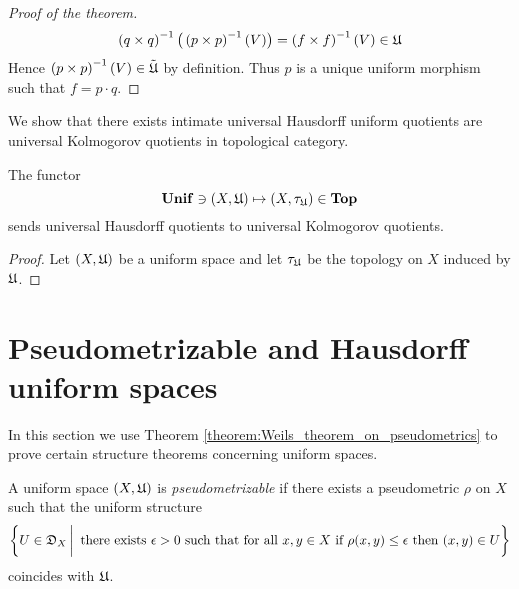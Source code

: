 \begin{proof}[Proof of the theorem]
$$\left(q\times q\right)^{-1}\big(\left(p\times p\right)^{-1}(V)\big) = \left(f\times f\right)^{-1}(V) \in {\mathfrak U}$$
Hence $\left(p\times p\right)^{-1}(V) \in \tilde{{\mathfrak U}}$ by definition. Thus $p$ is a unique uniform morphism such that $f = p\cdot q$.
\end{proof}
\noindent
We show that there exists intimate universal Hausdorff uniform quotients are universal Kolmogorov quotients in topological category.

\begin{proposition}\label{proposition:universal_Hausdordff_quotients_are_universal_Kolmogorov_quotients}
The functor
$$\mathbf{Unif} \ni (X,{\mathfrak U}) \mapsto (X,\tau_{{\mathfrak U}}) \in \mathbf{Top}$$
sends universal Hausdorff quotients to universal Kolmogorov quotients.
\end{proposition}
\begin{proof}
Let $(X,{\mathfrak U})$ be a uniform space and let $\tau_{{\mathfrak U}}$ be the topology on $X$ induced by ${\mathfrak U}$.
\end{proof}



\section{Pseudometrizable and Hausdorff uniform spaces}
\noindent
In this section we use Theorem \ref{theorem:Weils_theorem_on_pseudometrics} to prove certain structure theorems concerning uniform spaces. 

\begin{definition}
A uniform space $(X,{\mathfrak U})$ is \textit{pseudometrizable} if there exists a pseudometric $\rho$ on $X$ such that the uniform structure
$$\bigg\{U \in {\mathfrak D}_{X}\,\bigg|\,\mbox{ there exists }\epsilon>0\mbox{ such that for all }x,y\in X\mbox{ if }\rho(x,y)\leq \epsilon\mbox{ then }(x,y)\in U\bigg\}$$
coincides with ${\mathfrak U}$.
\end{definition}

